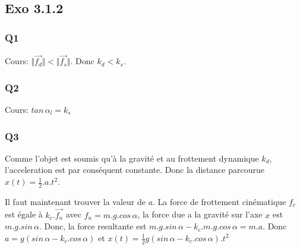 \documentclass[]{book}
\theoremstyle{definition}
\begin{document}
\subsection*{Exo 3.1.2}
\subsubsection*{Q1}
Cours: $\Vert \overrightarrow{f_d} \Vert < \Vert \overrightarrow{f_s} \Vert $. Donc  $k_d < k_s$.


\subsubsection*{Q2}
Cours: $ tan\, \alpha_l = k_s $


\subsubsection*{Q3}
Comme l'objet est soumis qu'\`a la gravit\'e et au frottement dynamique $k_d$, l'acceleration est par cons\'equent 
constante. Donc la distance parcourue $x(t) = \frac{1}{2}.a.t^2$. 

Il faut maintenant trouver la valeur de $a$.
La force de frottement cin\'ematique $f_c$ est \'egale \`a $k_c.\overrightarrow{f_n}$ avec $f_n=m.g.cos\, \alpha$,
la force due a la gravit\'e sur l'axe $x$ est $m.g.sin\, \alpha$. 
Donc, la force resultante est $m.g.sin\, \alpha - k_c.m.g.cos\, \alpha = m.a$. 
Donc $a = g(sin\, \alpha - k_c.cos\, \alpha)$ et $x(t) = \frac{1}{2}g(sin\, \alpha - k_c.cos\, \alpha).t^2$
\end{document}
